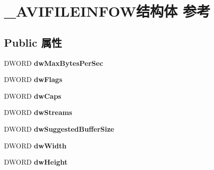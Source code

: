 \hypertarget{struct___a_v_i_f_i_l_e_i_n_f_o_w}{}\section{\+\_\+\+A\+V\+I\+F\+I\+L\+E\+I\+N\+F\+O\+W结构体 参考}
\label{struct___a_v_i_f_i_l_e_i_n_f_o_w}
\subsection*{Public 属性}
\begin{DoxyCompactItemize}
\item 
\mbox{\label{struct___a_v_i_f_i_l_e_i_n_f_o_w_a6ffb76a9387c0ac6b3e1e108988c2909}} 
D\+W\+O\+RD {\bfseries dw\+Max\+Bytes\+Per\+Sec}
\item 
\mbox{\label{struct___a_v_i_f_i_l_e_i_n_f_o_w_ae148154ce99d8cb9c19ff076c8214c5a}} 
D\+W\+O\+RD {\bfseries dw\+Flags}
\item 
\mbox{\label{struct___a_v_i_f_i_l_e_i_n_f_o_w_a8a420a35f8ed20a0fa733151544f2e2b}} 
D\+W\+O\+RD {\bfseries dw\+Caps}
\item 
\mbox{\label{struct___a_v_i_f_i_l_e_i_n_f_o_w_a94579c50d01ca245dadae84b9da6f3aa}} 
D\+W\+O\+RD {\bfseries dw\+Streams}
\item 
\mbox{\label{struct___a_v_i_f_i_l_e_i_n_f_o_w_a98f9f3d5e5b864a0b18c7eb81e7383e3}} 
D\+W\+O\+RD {\bfseries dw\+Suggested\+Buffer\+Size}
\item 
\mbox{\label{struct___a_v_i_f_i_l_e_i_n_f_o_w_a749aaf7178c8a09ac9a8247fad43ee51}} 
D\+W\+O\+RD {\bfseries dw\+Width}
\item 
\mbox{\label{struct___a_v_i_f_i_l_e_i_n_f_o_w_a9fa9ff590e3862a904ec65da7a09db50}} 
D\+W\+O\+RD {\bfseries dw\+Height}
\item 
\mbox{\label{struct___a_v_i_f_i_l_e_i_n_f_o_w_ac87182e76c273d43a3833e86e5094ccd}} 

\end{DoxyCompactItemize}
